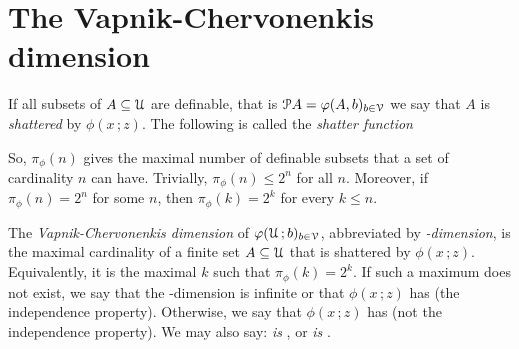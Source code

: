 \documentclass[scombinatorics.tex]{subfiles}
\begin{document}






\section{The Vapnik-Chervonenkis dimension}\label{VCdim}

If all subsets of $A\subseteq\EuScript U$ are definable, that is $\EuScript P A=\varphi(A,b)_{b\in\EuScript V}$ we say that $A$ is \emph{shattered\/} by $\phi(x\,;z)$.
The following is called the \emph{shatter function\/}



So, $\pi_\phi(n)$ gives the maximal number of definable subsets that a set of cardinality $n$ can have.
Trivially, $\pi_\phi(n)\le2^n$ for all $n$.
Moreover, if $\pi_\phi(n)=2^n$ for some $n$, then $\pi_\phi(k)=2^k$ for every $k\le n$.


The \emph{Vapnik-Cher\-vo\-nen\-kis dimension\/} of $\varphi(\EuScript U\,;b)_{b\in\EuScript V}$, abbreviated by \emph{\vc-dimension}, is the maximal cardinality of a finite set $A\subseteq\EuScript U$ that is shattered by $\phi(x\,;z)$.
Equivalently, it is the maximal $k$ such that $\pi_\phi(k)=2^k$.
If such a maximum does not exist,
we say that the \vc-dimension is infinite or that $\phi(x\,;z)$ has \emph{\ip\/} (the independence property).
Otherwise, we say that $\phi(x\,;z)$ has \emph{\nip\/} (not the independence property).
We may also say: \textit{is\/} \ip, or \textit{is\/} \nip.
\end{document}
